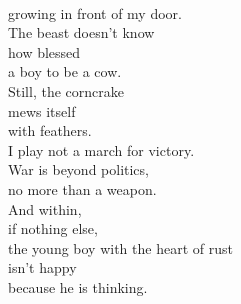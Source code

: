 \documentclass[smalldemyvopaper,11pt,twoside,onecolumn,openright,extrafontsizes]{memoir}
\begin{document}
\\growing in front of my door.
\\The beast doesn't know
\\how blessed
\\a boy to be a cow.
\\Still, the corncrake
\\mews itself
\\with feathers.
\\I play not a march for victory.
\\War is beyond politics,
\\no more than a weapon.
\\And within,
\\if nothing else,
\\the young boy with the heart of rust
\\isn't happy
\\because he is thinking.
\end{document}
